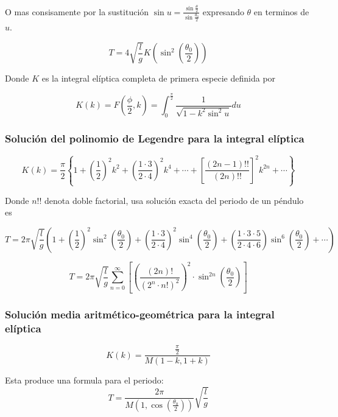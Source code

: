 \documentclass[12pt]{article}
\begin{document}
O mas consisamente por la sustitución $\sin u= \frac{\sin\frac{\theta}{2}}{\sin\frac{\theta_0}{2}}$ expresando $\theta$ en terminos de $u$.

\begin{equation}
T=4\sqrt{\frac{l}{g}} K \left(\sin^2\left(\frac{\theta_0}{2}\right)\right)
\end{equation}

Donde $K$ es la integral elíptica completa de primera especie definida por

\begin{equation}
K(k)=F\left(\frac{\phi}{2},k\right)= \int_0^{\frac{\pi}{2}} \frac{1}{\sqrt{1-k^2 \sin^2 u}}du
\end{equation}

\subsubsection{Solución del polinomio de Legendre para la integral elíptica  }

\begin{equation*}
K(k)=\frac{\pi}{2} \left \{ 1 + \left(\frac{1}{2}\right)^2 k^2 + \left(\frac{1 \cdotp 3}{2 \cdotp 4}\right)^2 k^4 + \cdots +\left[\frac{(2n-1)!!}{(2n)!!}\right]^2 k^{2n}+ \cdots \right \}
\end{equation*}

Donde $n!!$ denota doble factorial, usa solución exacta del periodo de un péndulo es

\begin{equation*}
T= 2\pi \sqrt{\frac{l}{g}}\left ( 1 + \left(\frac{1}{2}\right)^2 \sin^2 \left(\frac{\theta_0}{2}\right) + \left(\frac{1 \cdotp 3}{2 \cdotp 4}\right)^2 \sin^4\left(\frac{\theta_0}{2}\right) + \left(\frac{1 \cdotp 3 \cdotp 5 }{2 \cdotp 4 \cdotp 6}\right) \sin^6\left(\frac{\theta_0}{2}\right) + \cdots \right)
\end{equation*}

\begin{equation*}
T=2\pi \sqrt{\frac{l}{g}} \sum_{n=0}^\infty \left[\left(\frac{(2n)!}{(2^n \cdotp n!)^2}\right)^2 \cdotp \sin^{2n} \left(\frac{\theta_0}{2}\right)\right] 
\end{equation*}

\subsubsection{Solución media aritmético-geométrica para la integral elíptica}

\begin{equation*}
K(k)= \frac{\frac{\pi}{2}}{M(1-k,1+k)}
\end{equation*}

Esta produce una formula para el periodo:\\

\begin{equation*}
T=\frac{2\pi}{M\left(1,\cos\left(\frac{\theta_0}{2} \right)\right)}\sqrt{\frac{l}{g}}
\end{equation*}
\end{document}

